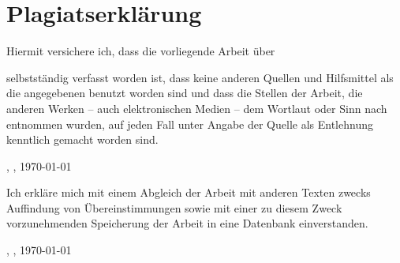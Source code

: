 
\chapter*{Plagiatserklärung}

Hiermit versichere ich, dass die vorliegende Arbeit über 
\begin{center}
\textit{\printtitel}
\end{center}
selbstständig verfasst worden ist, dass keine anderen Quellen und Hilfsmittel als die angegebenen benutzt worden sind und dass die Stellen der Arbeit, die anderen Werken – auch elektronischen Medien – dem Wortlaut oder Sinn nach entnommen wurden, auf jeden Fall unter Angabe der Quelle als Entlehnung kenntlich gemacht worden sind.

\vspace{2cm}

\parbox{20em}{\hrulefill}

\printname, \printort, \today

\vspace{3cm}
\noindent Ich erkläre mich mit einem Abgleich der Arbeit mit anderen Texten zwecks Auffindung von Übereinstimmungen sowie mit einer zu diesem Zweck vorzunehmenden Speicherung der Arbeit in eine Datenbank einverstanden.

\vspace{2cm}

\parbox{20em}{\hrulefill}

\printname, \printort, \today